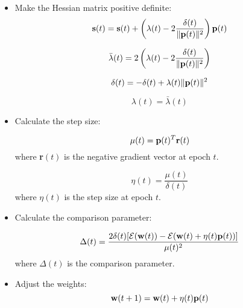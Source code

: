 \documentclass[10pt, conference]{IEEEtran}
\begin{document}
\begin{itemize}
    \item Make the Hessian matrix positive definite:
    \begin{equation}
        \text{\textbf{s}}(t) = \text{\textbf{s}}(t) + \left( \lambda(t) - 2 \frac{\delta(t)}{\| \text{\textbf{p}}(t) \|^2} \right) \text{\textbf{p}}(t) \label{eq: hessian_s}
    \end{equation}

    \begin{equation}
        \bar{\lambda}(t) = 2 \left( \lambda(t) - 2 \frac{\delta(t)}{\| \text{\textbf{p}}(t) \|^2} \right) \label{eq: hessian_lambda_bar}
    \end{equation}

    \begin{equation}
        \delta(t) = -\delta(t) + \lambda(t) \| \text{\textbf{p}}(t) \|^2 \label{eq: hessian_delta}
    \end{equation}

    \begin{equation}
        \lambda(t) = \bar{\lambda}(t) \label{eq: hessian_lambda}
    \end{equation}

    \item Calculate the step size:

    \begin{equation}
        \mu(t) = \text{\textbf{p}}(t)^T \text{\textbf{r}}(t) \label{eq: step_size_mu}
    \end{equation}
    where \textbf{r}$(t)$ is the negative gradient vector at epoch $t$.

    \begin{equation}
        \eta(t) = \frac{\mu(t)}{\delta(t)} \label{eq: step_size_eta}
    \end{equation}
    where $\eta(t)$ is the step size at epoch $t$.

    \item Calculate the comparison parameter:

    \begin{equation}
        \Delta(t) = \frac{2 \delta(t)[\mathcal{E}(\text{\textbf{w}}(t)) - \mathcal{E}(\text{\textbf{w}}(t) + \eta(t)\text{\textbf{p}}(t))]}{\mu(t)^2} \label{eq: comparison_parameter}
    \end{equation}
    where $\Delta(t)$ is the comparison parameter.

    \item Adjust the weights:
    \begin{equation}
        \text{\textbf{w}}(t+1) = \text{\textbf{w}}(t) + \eta(t)\text{\textbf{p}}(t) \label{eq: adjust_weights_w}
    \end{equation}


\end{itemize}
\end{document}
